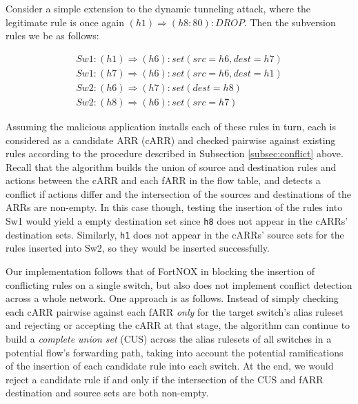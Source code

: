 Consider a simple extension to the dynamic tunneling attack, where the legitimate rule is once again $(h1) \Rightarrow (h8:80): DROP$. Then the subversion rules we be as follows: 

\begin{align}
  Sw1: (h1) \Rightarrow (h6): set(src=h6, dest=h7) \\
  Sw1: (h7) \Rightarrow (h6): set(src=h6, dest=h1) \\
  Sw2: (h6) \Rightarrow (h7): set(dest=h8) \\
  Sw2: (h8) \Rightarrow (h6): set(src=h7)
\end{align}

Assuming the malicious application installs each of these rules in turn, each is considered as a candidate ARR (cARR) and checked pairwise against existing rules according to the procedure described in Subsection \ref{subsec:conflict} above. Recall that the algorithm builds the union of source and destination rules and actions between the cARR and each fARR in the flow table, and detects a conflict if actions differ and the intersection of the sources and destinations of the ARRs are non-empty. In this case though, testing the insertion of the rules into Sw1 would yield a empty destination set since \texttt{h8} does not appear in the cARRs' destination sets. Similarly, \texttt{h1} does not appear in the cARRs' source sets for the rules inserted into Sw2, so they would be inserted successfully. 

Our implementation follows that of FortNOX in blocking the insertion of conflicting rules on a single switch, but also does not implement conflict detection across a whole network. One approach is as follows. Instead of simply checking each cARR pairwise against each fARR \emph{only} for the target switch's alias ruleset and rejecting or accepting the cARR at that stage, the algorithm can continue to build a \emph{complete union set} (CUS) across the alias rulesets of all switches in a potential flow's forwarding path, taking into account the potential ramifications of the insertion of each candidate rule into each switch. At the end, we would reject a candidate rule if and only if the intersection of the CUS and fARR destination and source sets are both non-empty. 

